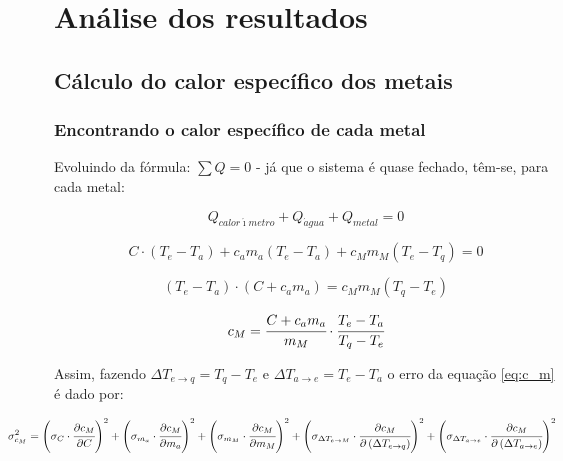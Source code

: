 \documentclass[a4paper]{article}
\begin{document}
	\section{Análise dos resultados}

		\subsection{Cálculo do calor específico dos metais}

			\subsubsection{Encontrando o calor específico de cada metal}

				Evoluindo da fórmula: $\sum Q=0$ - já que o sistema é quase fechado, têm-se, para cada metal:

				\begin{equation}
				Q_{calor\acute{\imath}metro}+Q_{\acute{a}gua}+Q_{metal}=0
				\end{equation}

				\[
				C\cdot\left(T_{e}-T_{a}\right)+c_{a}m_{a}\left(T_{e}-T_{a}\right)+c_{M}m_{M}\left(T_{e}-T_{q}\right)=0
				\]


				\[
				\left(T_{e}-T_{a}\right)\cdot\left(C+c_{a}m_{a}\right)=c_{M}m_{M}\left(T_{q}-T_{e}\right)
				\]


				\begin{equation}
				c_{M}=\cfrac{C+c_{a}m_{a}}{m_{M}}\cdot\cfrac{T_{e}-T_{a}}{T_{q}-T_{e}}\label{eq:c_m}
				\end{equation}


				Assim, fazendo $\Delta T_{e\rightarrow q}=T_{q}-T_{e}$ e $\Delta T_{a\rightarrow e}=T_{e}-T_{a}$
				o erro da equação \eqref{eq:c_m} é dado por:
                
                \begin{equation}
                \hspace{-1,5cm}%
				\sigma_{c_{M}}^{2}=\left(\sigma_{C}\cdot\cfrac{\partial c_{M}}{\partial C}\right)^{2}+\left(\sigma_{m_{a}}\cdot\cfrac{\partial c_{M}}{\partial m_{a}}\right)^{2}+\left(\sigma_{m_{M}}\cdot\cfrac{\partial c_{M}}{\partial m_{M}}\right)^{2}+\left(\sigma_{\Delta T_{e\rightarrow M}}\cdot\cfrac{\partial c_{M}}{\partial\left(\Delta T_{e\rightarrow q}\right)}\right)^{2}+\left(\sigma_{\Delta T_{a\rightarrow e}}\cdot\cfrac{\partial c_{M}}{\partial\left(\Delta T_{a\rightarrow e}\right)}\right)^{2}
				\end{equation}
\end{document}
